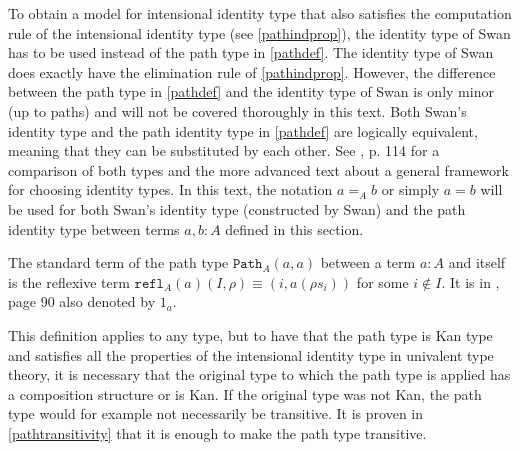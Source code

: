 \documentclass[12pt,a4paper,twoside,xetex]{book} %
\newcommand{\op}[1]{\mathtt{#1}}
\begin{document}
To obtain a model for intensional identity type that also satisfies the 
computation rule of the intensional identity type (see \cref{pathindprop}), the 
identity type of Swan \cite{Swan2014} has to be used instead of the path type 
in \cref{pathdef}. The identity type of Swan does exactly have the elimination 
rule of \cref{pathindprop}. However, the difference between the path type in 
\cref{pathdef} and the identity type of Swan is only minor (up to paths) and 
will not be covered thoroughly in this text. Both Swan's identity type and the 
path identity type in \cref{pathdef} are logically equivalent, meaning that 
they can be substituted by each other. See  \cite{Huber2016}, p. 114 for a 
comparison of both types and the more advanced text \cite{Swa18} about a 
general framework for choosing identity types. In this text, the notation $a 
=_A b$ or simply $a = b$ will be used for both Swan's identity type 
(constructed by Swan) and the path identity type between terms $a, b: A$ defined 
in this section. 

The standard term of the path type $\op{Path}_A(a,a)$ between a term $a : A$ 
and itself  is the reflexive term $\op{refl}_A(a)(I,\rho) \equiv (i, a(\rho 
s_i))$ for some $i \not \in I$. It is in \cite{Huber2016}, page 90 also denoted 
by $1_a$.

This definition applies to any type, but to have that the path type is Kan type 
and satisfies all the properties of the intensional identity type in univalent 
type theory, it is necessary that the original type to which the path type is 
applied has a composition structure or is Kan. If the original type was not 
Kan, the path type would for example not necessarily be transitive. It is proven in \cref{pathtransitivity} that it is enough to make the path type transitive.
\end{document}
